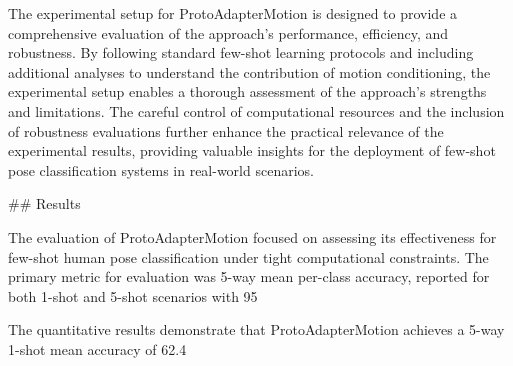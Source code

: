 \documentclass[11pt]{article}
\begin{document}
The experimental setup for ProtoAdapterMotion is designed to provide a comprehensive evaluation of the approach's performance, efficiency, and robustness. By following standard few-shot learning protocols and including additional analyses to understand the contribution of motion conditioning, the experimental setup enables a thorough assessment of the approach's strengths and limitations. The careful control of computational resources and the inclusion of robustness evaluations further enhance the practical relevance of the experimental results, providing valuable insights for the deployment of few-shot pose classification systems in real-world scenarios.

## Results

The evaluation of ProtoAdapterMotion focused on assessing its effectiveness for few-shot human pose classification under tight computational constraints. The primary metric for evaluation was 5-way mean per-class accuracy, reported for both 1-shot and 5-shot scenarios with 95%

The quantitative results demonstrate that ProtoAdapterMotion achieves a 5-way 1-shot mean accuracy of 62.4%
\end{document}
